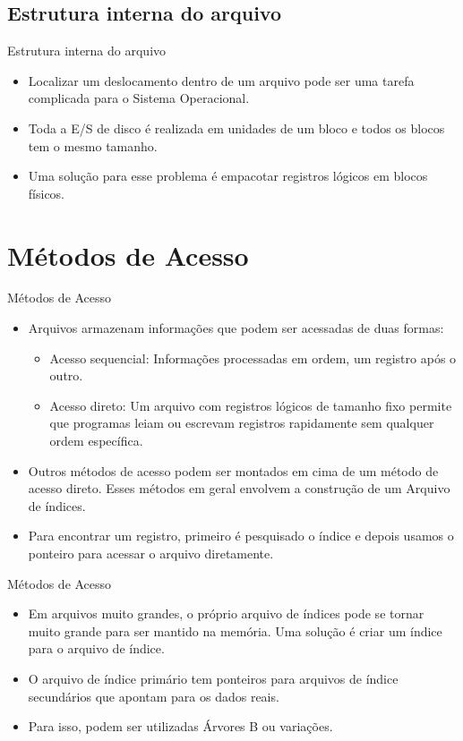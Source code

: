 \documentclass[10pt,brazil]{beamer}
\begin{document}
\subsection{Estrutura interna do arquivo}
\begin{frame}{Estrutura interna do arquivo}
	\begin{itemize}
	\item Localizar um deslocamento dentro de um arquivo pode ser uma tarefa complicada para o Sistema Operacional. 
	\item Toda a E/S de disco é realizada em unidades de um bloco e todos os blocos tem o mesmo tamanho.
	\item Uma solução para esse problema é empacotar registros lógicos em blocos físicos.
	\end{itemize} 
	
  \end{frame}
  
\section{Métodos de Acesso}%
\begin{frame}{Métodos de Acesso}
	\begin{itemize}
	\item Arquivos armazenam informações que podem ser acessadas de duas formas:
		\begin{itemize}
		\item Acesso sequencial: Informações processadas em ordem, um registro após o outro.
		\item Acesso direto: Um arquivo com registros lógicos de tamanho fixo permite que programas leiam ou escrevam registros rapidamente sem qualquer ordem específica.
		\end{itemize}
	\item Outros métodos de acesso podem ser montados em cima de um método de acesso direto. Esses métodos em geral envolvem a construção de um Arquivo de índices.
	\item Para encontrar um registro, primeiro é pesquisado o índice e depois usamos o ponteiro para acessar o arquivo diretamente.
	\end{itemize}

\end{frame}  
  
  
\begin{frame}{Métodos de Acesso}
\begin{itemize}
\item Em arquivos muito grandes, o próprio arquivo de índices pode se tornar muito grande para ser mantido na memória. Uma solução é criar um índice para o arquivo de índice.
\item O arquivo de índice primário tem ponteiros para arquivos de índice secundários que apontam para os dados reais.
\item Para isso, podem ser utilizadas Árvores B ou variações.
\end{itemize}

\end{frame}
  
\end{document}
